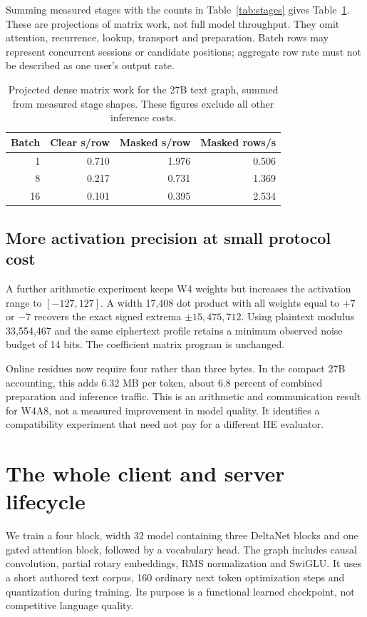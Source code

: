 \documentclass[10pt,twocolumn]{article}
\begin{document}
Summing measured stages with the counts in Table~\ref{tab:stages} gives
Table~\ref{tab:linear}. These are projections of matrix work, not full model
throughput. They omit attention, recurrence, lookup, transport and preparation.
Batch rows may represent concurrent sessions or candidate positions; aggregate
row rate must not be described as one user's output rate.

\begin{table}[t]
\centering\small
\setlength{\tabcolsep}{4.5pt}
\begin{tabular}{rrrr}
\toprule
Batch & Clear s/row & Masked s/row & Masked rows/s\\
\midrule
1 & 0.710 & 1.976 & 0.506\\
8 & 0.217 & 0.731 & 1.369\\
16 & 0.101 & 0.395 & 2.534\\
\bottomrule
\end{tabular}
\caption{Projected dense matrix work for the 27B text graph, summed from
measured stage shapes. These figures exclude all other inference costs.}
\label{tab:linear}
\end{table}

\subsection{More activation precision at small protocol cost}
A further arithmetic experiment keeps W4 weights but increases the activation
range to $[-127,127]$. A width 17,408 dot product with all weights equal to
$+7$ or $-7$ recovers the exact signed extrema $\pm15,475,712$. Using plaintext
modulus 33,554,467 and the same ciphertext profile retains a minimum observed
noise budget of 14 bits. The coefficient matrix program is unchanged.

Online residues now require four rather than three bytes. In the compact
27B accounting, this adds 6.32 MB per token, about 6.8 percent of combined
preparation and inference traffic. This is an arithmetic and communication
result for W4A8, not a measured improvement in model quality. It identifies a
compatibility experiment that need not pay for a different HE evaluator.

\section{The whole client and server lifecycle}
We train a four block, width 32 model containing three DeltaNet blocks and one
gated attention block, followed by a vocabulary head. The graph includes causal
convolution, partial rotary embeddings, RMS normalization and SwiGLU. It uses a
short authored text corpus, 160 ordinary next token optimization steps and
quantization during training. Its purpose is a functional learned checkpoint,
not competitive language quality.
\end{document}
